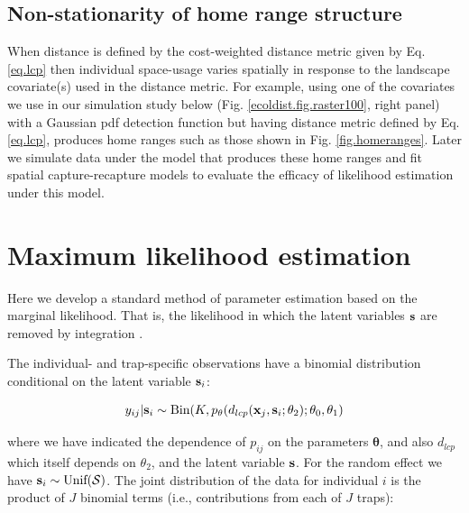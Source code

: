 \documentclass[12pt]{article}
\begin{document}
\begin{spacing}{1.8}
\subsection{Non-stationarity of home range structure}

When distance is defined by the cost-weighted distance metric given
by Eq. \ref{eq.lcp} then individual space-usage varies
spatially in response to the landscape covariate(s) used in the
distance metric. For example, using one of the covariates we use in
our simulation study below (Fig. \ref{ecoldist.fig.raster100}, right
panel) with a Gaussian pdf detection function but having distance
metric defined by Eq. \ref{eq.lcp}, produces home ranges such
as those shown in Fig. \ref{fig.homeranges}. Later we simulate data
under the model that produces these home ranges and fit spatial
capture-recapture models to evaluate the efficacy of likelihood
estimation under this model.




\section{Maximum likelihood estimation}
\label{sec.mle}

Here we develop a standard method of parameter estimation based on
the marginal likelihood. That is, the likelihood in which the latent
variables ${\bf s}$ are removed by integration \citep{borchers_efford:2008}.

The individual- and trap-specific observations have a binomial
distribution conditional on the latent variable ${\bf s}_{i}$:

\begin{equation}
	y_{ij}| {\bf s}_{i} \sim \mbox{Bin}(K, p_{\theta}(d_{lcp}({\bf x}_{j},{\bf s}_{i};\theta_{2}); \theta_{0}, \theta_{1})
\label{mle.eq.cond-on-s}
\end{equation}

{\flushleft where} we have indicated the dependence of $p_{ij}$ on the parameters
${\bm \theta}$, and also $d_{lcp}$ which
itself depends on $\theta_{2}$, and the latent variable ${\bf s}$.
For the random effect we have ${\bf s}_{i} \sim  \mbox{Unif}({\cal
  S})$.
The joint distribution of the data for individual $i$ is the product
of $J$ binomial terms (i.e., contributions from each of $J$ traps):


\end{spacing}
\end{document}

